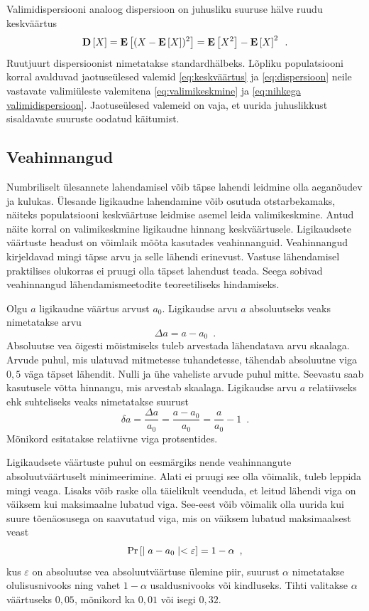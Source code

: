 Valimidispersiooni analoog dispersioon on juhusliku suuruse hälve ruudu keskväärtus
\begin{equation}
    \label{eq:dispersioon}
    \operatorname*{\mathbf{D}}\left[X\right]=\operatorname*{\mathbf{E}}\left[(X-\operatorname*{\mathbf{E}}\left[X\right])^2\right]=\operatorname*{\mathbf{E}}\left[X^2\right]-\operatorname*{\mathbf{E}}\left[X\right]^2 \enspace.
\end{equation}
Ruutjuurt dispersioonist nimetatakse standardhälbeks. Lõpliku populatsiooni korral avalduvad jaotuseülesed valemid \eqref{eq:keskväärtus} ja \eqref{eq:dispersioon} neile vastavate valimiüleste valemitena \eqref{eq:valimikeskmine} ja \eqref{eq:nihkega valimidispersioon}. Jaotuseülesed valemeid on vaja, et uurida juhuslikkust sisaldavate suuruste oodatud käitumist.

\subsection{Veahinnangud}
\label{section:veahinnangud}
Numbriliselt ülesannete lahendamisel võib täpse lahendi leidmine olla aeganõudev ja kulukas.
Ülesande ligikaudne lahendamine võib osutuda otstarbekamaks, näiteks populatsiooni keskväärtuse leidmise asemel leida valimikeskmine. Antud näite korral on valimikeskmine ligikaudne hinnang keskväärtusele. Ligikaudsete väärtuste headust on võimlaik mõõta kasutades veahinnanguid. Veahinnangud kirjeldavad mingi täpse arvu ja selle lähendi erinevust. Vastuse lähendamisel praktilises olukorras ei pruugi olla täpset lahendust teada. Seega sobivad veahinnangud lähendamismeetodite teoreetiliseks hindamiseks.

Olgu $a$ ligikaudne väärtus arvust $a_0$. Ligikaudse arvu $a$ absoluutseks veaks nimetatakse arvu
\begin{equation*}
    \Delta a=a-a_0 \enspace.
\end{equation*}
Absoluutse vea õigesti mõistmiseks tuleb arvestada lähendatava arvu skaalaga. Arvude puhul, mis ulatuvad mitmetesse tuhandetesse, tähendab absoluutne viga $0{,}5$ väga täpset lähendit. Nulli ja ühe vaheliste arvude puhul mitte. Seevastu saab kasutusele võtta hinnangu, mis arvestab skaalaga. Ligikaudse arvu $a$ relatiivseks ehk suhteliseks veaks nimetatakse suurust
\begin{equation*}
    \delta a=\frac{\Delta a}{a_0}=\frac{a-a_0}{a_0}=\frac{a}{a_0}-1 \enspace.
\end{equation*}
Mõnikord esitatakse relatiivne viga protsentides.

Ligikaudsete väärtuste puhul on eesmärgiks nende veahinnangute absoluutväärtuselt minimeerimine. Alati ei pruugi see olla võimalik, tuleb leppida mingi veaga. Lisaks võib raske olla täielikult veenduda, et leitud lähendi viga on väiksem kui maksimaalne lubatud viga. See-eest võib võimalik olla uurida kui suure tõenäosusega on saavutatud viga, mis on väiksem lubatud maksimaalsest veast
\begin{equation*}
    \Pr\left[\mid a - a_0 \mid < \varepsilon\right] = 1 - \alpha \enspace,
\end{equation*}
kus $\varepsilon$ on absoluutse vea absoluutväärtuse ülemine piir, suurust $\alpha$ nimetatakse olulisusnivooks ning vahet $1-\alpha$ usaldusnivooks või kindluseks. Tihti valitakse $\alpha$ väärtuseks $0{,}05$, mõnikord ka $0{,}01$ või isegi $0{,}32$.


